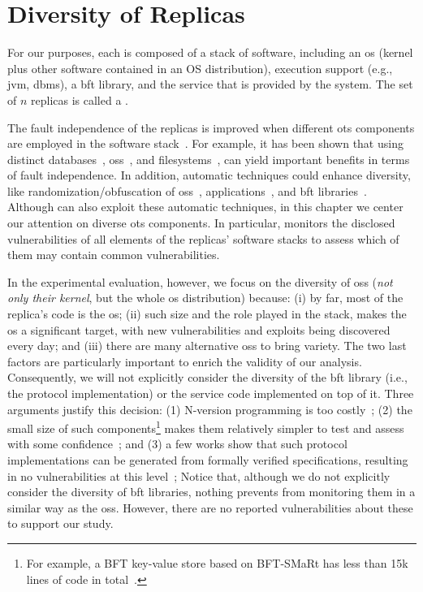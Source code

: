 \section{Diversity of Replicas}
\label{sec:diversityofreplicas}

For our purposes, each \replica is composed of a stack of software, including an \gls{os} (kernel plus other software contained in an OS distribution), execution support (e.g., \gls{jvm}, \gls{dbms}), a \gls{bft} library, and the service that is provided by the system.
The set of $n$ replicas is called a \ES.

The fault independence of the replicas is improved when different \gls{ots} components are employed in the software stack~\cite{Deswarte:1998}. 
For example, it has been shown that using distinct databases~\cite{Gashi:2007}, \glspl{os}~\cite{Garcia:2013}, and filesystems~\cite{Castro:2003,Bairavasundaram:2009}, can yield important benefits in terms of fault independence. 
In addition, automatic techniques could enhance diversity, like randomization/obfuscation of \glspl{os}~\cite{Roeder:2010}, applications~\cite{King:2016}, and \gls{bft} libraries~\cite{Platania:2014}.
Although \system can also exploit these automatic techniques, in this chapter we center our attention on diverse \gls{ots} components. 
In particular, \system monitors the disclosed vulnerabilities of all elements of the replicas' software stacks to assess which of them may contain common vulnerabilities.  

In the experimental evaluation, however, we focus on the diversity of \glspl{os} (\emph{not only their kernel}, but the whole \gls{os} distribution) because: (i) by far, most of the replica's code is the \gls{os}; 
(ii) such size and the role played in the stack, makes the \gls{os} a significant target, with new vulnerabilities and exploits being discovered every day; 
and (iii) there are many alternative \glspl{os} to bring variety. 
The two last factors are particularly important to enrich the validity of our analysis. 
Consequently, we will not explicitly consider the diversity of the \gls{bft} library (i.e., the protocol implementation) or the service code implemented on top of it. 
Three arguments justify this decision: (1) N-version programming is too costly~\cite{Avizienis:1977}; (2) the small size of such components\footnote{For example, a BFT key-value store based on BFT-SMaRt has less than 15k lines of code in total~\cite{Bessani:2014}.} makes them relatively simpler to test and assess with some confidence~\cite{Martins:2013,Lee:2014}; and (3) a few works show that such protocol implementations can be generated from formally verified specifications, resulting in no vulnerabilities at this level~\cite{Hawblitzel:2015,Rahli:2018};
Notice that, although we do not explicitly consider the diversity of \gls{bft} libraries, nothing prevents \system from monitoring them in a similar way as the \glspl{os}.
However, there are no reported vulnerabilities about these to support our study.


